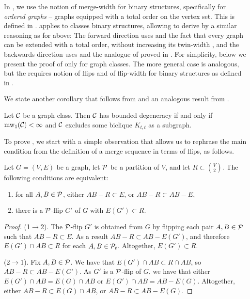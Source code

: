 \cortww*
In , we use the notion of merge-width for binary structures, specifically for \emph{ordered graphs} --  graphs equipped with a total order on the vertex set. This is defined in .   applies to classes binary structures, allowing to derive  by a similar reasoning as for  above:
The forward direction uses and the fact that every graph can be extended with a total order, without increasing its twin-width \cite{tww4}, and the backwards direction uses  and the analogue of  proved in \cite[Thm. VII.3]{flip-width}.
For simplicity, below we present the proof of  only for graph classes. The more general case is analogous, 
but the requires notion of flips and of flip-width for binary structures as defined in \cite[Sec. V.B]{flip-width}.

We state another corollary that follows from  and an analogous result from \cite[Thm. VI.1]{flip-width}.
\begin{corollary}\label{cor:deg}
  Let $\CC$ be a graph class. Then $\CC$ has bounded degeneracy if and only if $\mw_1(\CC)<\infty$ and $\CC$ excludes some biclique $K_{t,t}$ as a subgraph.
\end{corollary}




\medskip
To prove ,
we start with a simple observation that allows us to rephrase the main condition from the definition 
of a merge sequence in terms of flips, as follows.


\begin{lemma}\label{lem:flip}
    Let $G=(V,E)$ be a graph, let $\cal P$ be a partition of $V$, and let $R\subset {V\choose 2}$.
    The following conditions are equivalent:
    \begin{enumerate}
        \item for all $A,B\in\cal P$, either $AB-R\subset E$, or $AB-R\subset AB - E$,
        \item  there is a $\cal P$-flip $G'$ of $G$ with $E(G')\subset R$.
    \end{enumerate}
    \end{lemma}
    \begin{proof}
        (1$\rightarrow$2).
        The $\cal P$-flip $G'$
        is obtained from $G$ by flipping each pair $A,B\in\cal P$ such that $AB-R\subset E$. As a result $AB-R\subset AB-E(G')$, 
        and therefore $E(G')\cap AB\subset R$ for each $A,B\in\cal P_t$.
        Altogether, $E(G')\subset R$.
    
        (2$\rightarrow$1). Fix $A,B\in\cal P$. We have that
        $E(G')\cap AB\subset R\cap AB$,
        so $AB-R\subset AB-E(G')$.
        As $G'$ is a $\cal P$-flip of $G$,
        we have that either $E(G')\cap AB=E(G)\cap AB$ or $E(G')\cap AB=AB-E(G)$.
        Altogether, either $AB-R\subset E(G)\cap AB$, or  $AB-R\subset AB-E(G)$.
    \end{proof}
    
